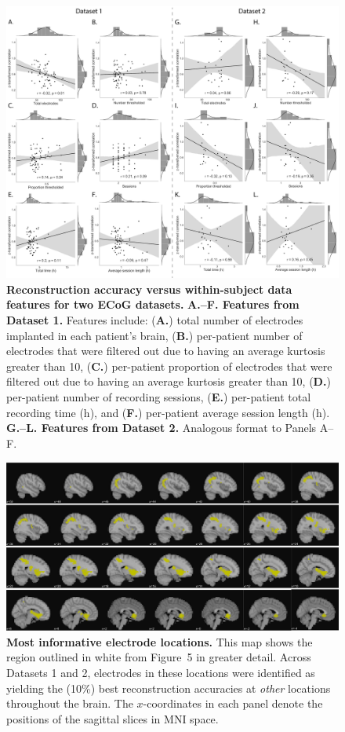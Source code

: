 \documentclass[10pt]{article}
\begin{document}
\begin{figure}[p]
\centering
\includegraphics[width=\textwidth]{figs/supplemental_4}
\caption{\textbf{Reconstruction accuracy versus within-subject data
    features for two ECoG datasets.} \textbf{A.--F.  Features from
    Dataset 1.}  Features include: (\textbf{A.}) total number of
  electrodes implanted in each patient's brain, (\textbf{B.})
  per-patient number of electrodes that were filtered out due to
  having an average kurtosis greater than 10, (\textbf{C.})
  per-patient proportion of electrodes that were filtered out due to
  having an average kurtosis greater than 10, (\textbf{D.})
  per-patient number of recording sessions, (\textbf{E.}) per-patient
  total recording time (h), and (\textbf{F.}) per-patient average
  session length (h).  \textbf{G.--L. Features from Dataset 2.}
  Analogous format to Panels A--F.}
\label{fig:supplemental_4}
\end{figure}


\begin{figure}[ptb]
\centering
\includegraphics[width=\textwidth]{figs/supplemental_5}
\caption{\textbf{Most informative electrode locations.}  This map
  shows the region outlined in white from Figure~5 in greater detail.
  Across Datasets 1 and 2, electrodes in these locations were
  identified as yielding the (10\%) best reconstruction accuracies at
  \textit{other} locations throughout the brain.  The $x$-coordinates
  in each panel denote the positions of the sagittal slices in MNI space.}
\label{fig:supplemental_5}
\end{figure}


% 
\end{document}
